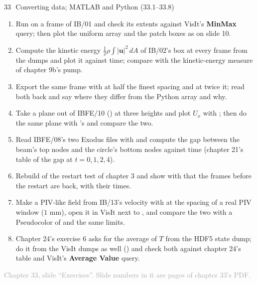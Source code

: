 \documentclass[aspectratio=169,11pt]{beamer}
\newcommand{\sourcecredit}[1]{\vfill\begin{flushright}\tiny\textcolor{DarkGray}{#1}\end{flushright}}
\providecommand{\gui}[1]{\textsf{\textbf{#1}}}
\begin{document}
\begin{frame}{33\,\textbullet\ Converting data; MATLAB and Python (33.1--33.8)}
\label{fr:c33x1}
\footnotesize
\begin{enumerate}
  \item[33.1] Run  on a frame of IB/01 and check its  extents against VisIt's \gui{MinMax} query; then plot the uniform array and the patch boxes as on slide 10.
  \item[33.2] Compute the kinetic energy $\frac12 \rho \int |\mathbf{u}|^2\,dA$ of IB/02's box at every frame from the dumps and plot it against time; compare with the kinetic-energy measure of chapter 9b's pump.
  \item[33.3] Export the same frame with  at half the finest spacing and at twice it; read both back and say where they differ from the Python array and why.
  \item[33.4] Take a plane out of IBFE/10 () at three heights and plot $U_x$ with ; then do the same plane with 's  and compare the two.
  \item[33.5] Read IBFE/08's two Exodus files with  and compute the gap between the beam's top nodes and the circle's bottom nodes against time (chapter 21's table of the gap at $t = 0, 1, 2, 4$).
  \item[33.6] Rebuild  of the restart test of chapter 3 and show with  that the frames before the restart are back, with their times.
  \item[33.7] Make a PIV-like field from IB/13's velocity with  at the spacing of a real PIV window ($1$ mm), open it in VisIt next to , and compare the two with a Pseudocolor of  and the same limits.
  \item[33.8] Chapter 24's exercise 6 asks for the average of $T$ from the HDF5 state dump; do it from the VisIt dumps as well () and check both against chapter 24's table and VisIt's \gui{Average Value} query.
\end{enumerate}
\sourcecredit{Chapter 33, slide ``Exercises''. Slide numbers in it are pages of chapter 33's PDF.}
\end{frame}
\end{document}
